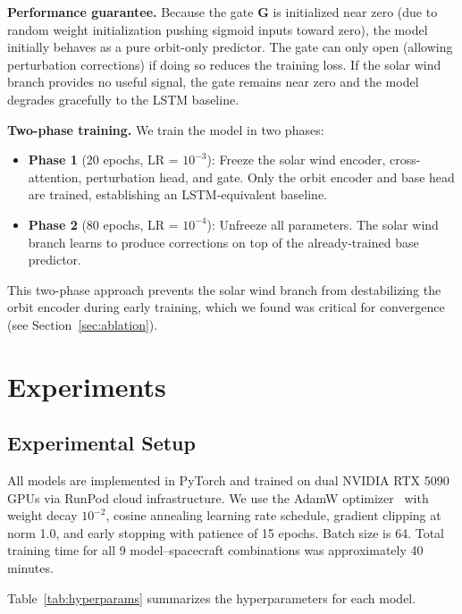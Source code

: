 \documentclass[twocolumn]{article}
\begin{document}
\textbf{Performance guarantee.} Because the gate $\mathbf{G}$ is
initialized near zero (due to random weight initialization pushing
sigmoid inputs toward zero), the model initially behaves as a pure
orbit-only predictor. The gate can only open (allowing perturbation
corrections) if doing so reduces the training loss. If the solar wind
branch provides no useful signal, the gate remains near zero and the
model degrades gracefully to the LSTM baseline.

\textbf{Two-phase training.} We train the model in two phases:

\begin{itemize}
  \item \textbf{Phase 1} (20 epochs, LR = $10^{-3}$): Freeze the solar
    wind encoder, cross-attention, perturbation head, and gate. Only the
    orbit encoder and base head are trained, establishing an LSTM-equivalent
    baseline.
  \item \textbf{Phase 2} (80 epochs, LR = $10^{-4}$): Unfreeze all
    parameters. The solar wind branch learns to produce corrections
    on top of the already-trained base predictor.
\end{itemize}

This two-phase approach prevents the solar wind branch from destabilizing
the orbit encoder during early training, which we found was critical for
convergence (see Section~\ref{sec:ablation}).

\section{Experiments}
\label{sec:experiments}

\subsection{Experimental Setup}

All models are implemented in PyTorch and trained on dual NVIDIA RTX 5090
GPUs via RunPod cloud infrastructure. We use the AdamW
optimizer~\citep{loshchilov2019decoupled} with weight decay $10^{-2}$,
cosine annealing learning rate schedule, gradient clipping at norm 1.0,
and early stopping with patience of 15 epochs. Batch size is 64. Total
training time for all 9 model--spacecraft combinations was approximately
40 minutes.

Table~\ref{tab:hyperparams} summarizes the hyperparameters for each model.
\end{document}
